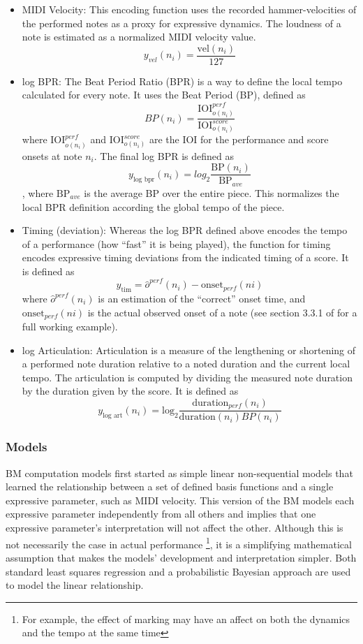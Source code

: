 \newcommand{\iois}{\textrm{IOI}_{o(n_i)}^{score}}
\newcommand{\ioip}{\textrm{IOI}_{o(n_i)}^{perf}}
\begin{itemize}
    \item MIDI Velocity: This encoding function uses the recorded hammer-velocities of the performed notes as a proxy for expressive dynamics. The loudness of a note is estimated as a normalized MIDI velocity value. $$y_{vel}(n_i) = \frac{\textrm{vel}(n_i)}{127}$$
    \item log BPR: The Beat Period Ratio (BPR) is a way to define the local tempo calculated for every note. It uses the Beat Period (BP), defined as $$BP(n_i) = \frac{\ioip}{\iois}$$ where $\ioip$ and $\iois$ are the IOI for the performance and score onsets at note $n_i$. The final log BPR is defined as $$y_{\textrm{log bpr}}(n_i) = log_2\frac{\textrm{BP}(n_i)}{\textrm{BP}_{ave}}$$, where $\textrm{BP}_{ave}$ is the average BP over the entire piece. This normalizes the local BPR definition according the global tempo of the piece. 
    \item Timing (deviation): Whereas the log BPR defined above encodes the tempo of a performance (how ``fast'' it is being played), the function for timing encodes expressive timing deviations from the indicated timing of a score. It is defined as $$y_{\textrm{tim}} = \hat{o}^{perf}(n_i) - \textrm{onset}_{perf}(ni)$$ where $\hat{o}^{perf}(n_i)$ is an estimation of the ``correct'' onset time, and $\textrm{onset}_{perf}(ni)$ is the actual observed onset of a note (see section 3.3.1 of \citet{eduardo2018computational} for a full working example). 
    \item log Articulation: Articulation is a measure of the lengthening or shortening of a performed note duration relative to a noted duration and the current local tempo. The articulation is computed by dividing the measured note duration by the duration given by the score. It is defined as $$y_{\textrm{log art}}(n_i) = \textrm{log}_2\frac{\textrm{duration}_{perf}(n_i)}{\textrm{duration}(n_i)BP(n_i)}$$
\end{itemize}

\subsubsection{Models}
BM computation models first started as simple linear non-sequential models that learned the relationship between a set of defined basis functions and a single expressive parameter, such as MIDI velocity. This version of the BM models each expressive parameter independently from all others and implies that one expressive parameter's interpretation will not affect the other. Although this is not necessarily the case in actual performance \footnote{For example, the effect of  marking may have an affect on both the dynamics and the tempo at the same time}, it is a simplifying mathematical assumption that makes the models' development and interpretation simpler. Both standard least squares regression and a probabilistic Bayesian approach are used to model the linear relationship. 

